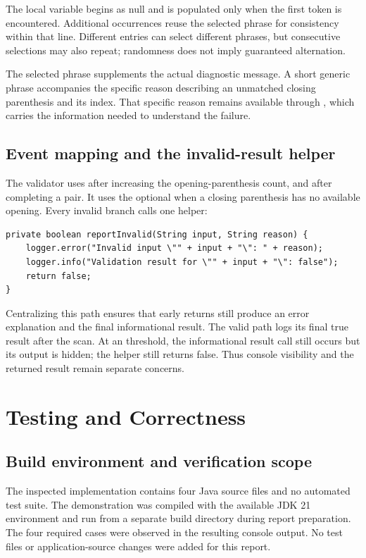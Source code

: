 The local variable begins as null and is populated only when the first  token is encountered. Additional occurrences reuse the selected phrase for consistency within that line. Different entries can select different phrases, but consecutive selections may also repeat; randomness does not imply guaranteed alternation.

The selected phrase supplements the actual diagnostic message. A short generic phrase accompanies the specific reason describing an unmatched closing parenthesis and its index. That specific reason remains available through , which carries the information needed to understand the failure.

\subsection{Event mapping and the invalid-result helper}
The validator uses  after increasing the opening-parenthesis count, and  after completing a pair. It uses the optional  when a closing parenthesis has no available opening. Every invalid branch calls one helper:

\begin{samepage}
\begin{lstlisting}
private boolean reportInvalid(String input, String reason) {
    logger.error("Invalid input \"" + input + "\": " + reason);
    logger.info("Validation result for \"" + input + "\": false");
    return false;
}
\end{lstlisting}
\end{samepage}

Centralizing this path ensures that early returns still produce an error explanation and the final informational result. The valid path logs its final true result after the scan. At an  threshold, the informational result call still occurs but its output is hidden; the helper still returns false. Thus console visibility and the returned result remain separate concerns.

\section{Testing and Correctness}
\subsection{Build environment and verification scope}
The inspected implementation contains four Java source files and no automated test suite. The demonstration was compiled with the available JDK 21 environment and run from a separate build directory during report preparation. The four required cases were observed in the resulting console output. No test files or application-source changes were added for this report.

